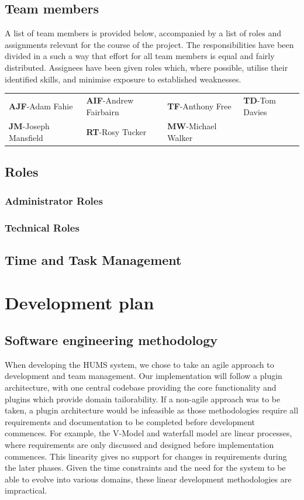 \documentclass[10pt,a4paper]{article}
\begin{document}
\subsection{Team members}
A list of team members is provided below, accompanied by a list of roles and
assignments relevant for the course of the project. The responsibilities have
been divided in a such a way that effort for all team members is equal and
fairly distributed. Assignees have been given roles which, where possible,
utilise their identified skills, and minimise exposure to established
weaknesses.

\begin{tabular}{ p{4cm} p{4cm} p{4cm} p{4cm} }
	\textbf{AJF}-Adam Fahie & \textbf{AIF}-Andrew Fairbairn &
			\textbf{TF}-Anthony Free & \textbf{TD}-Tom Davies \\
	\textbf{JM}-Joseph Mansfield & \textbf{RT}-Rosy Tucker &
			\textbf{MW}-Michael Walker & \\
\end{tabular}

\subsection{Roles}
\subsubsection{Administrator Roles} 


\subsubsection{Technical Roles}


\subsection{Time and Task Management}


\section{Development plan}

\subsection{Software engineering methodology}
When developing the HUMS system, we chose to take an agile approach to
development and team management. Our implementation will follow a plugin
architecture, with one central codebase providing the core functionality and
plugins which provide domain tailorability. If a non-agile approach was to be
taken, a plugin architecture would be infeasible as those methodologies require
all requirements and documentation to be completed before development commences.
For example, the V-Model and waterfall model are linear processes, where
requirements are only discussed and designed before implementation commences.
This linearity gives no support for changes in requirements during the later
phases. Given the time constraints and the need for the system to be able to
evolve into various domains, these linear development methodologies are
impractical.
\end{document}
